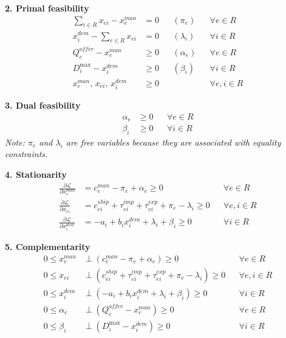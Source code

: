 \documentclass[11pt,a4paper]{article}
\begin{document}
\textbf{2. Primal feasibility}
\begin{align}
\sum_{i\in R}x_{ei}-x_e^{man} &= 0
&& (\pi_e)
&& \forall e\in R
\label{eq:kkt_primal_prod_bal}
\\
x_i^{dem}-\sum_{e\in R}x_{ei} &= 0
&& (\lambda_i)
&& \forall i\in R
\label{eq:kkt_primal_dem_bal}
\\
Q_e^{offer}-x_e^{man} &\ge 0
&& (\alpha_e)
&& \forall e\in R
\label{eq:kkt_primal_prod_bound}
\\
D_i^{\max}-x_i^{dem} &\ge 0
&& (\beta_i)
&& \forall i\in R
\label{eq:kkt_primal_dem_bound}
\\
x_e^{man},\,x_{ei},\,x_i^{dem} &\ge 0
&&
&& \forall e,i\in R
\label{eq:kkt_primal_nonneg}
\end{align}

\textbf{3. Dual feasibility}
\begin{align}
\alpha_e &\ge 0
&& \forall e\in R
\label{eq:kkt_dual_prod}
\\
\beta_i &\ge 0
&& \forall i\in R
\label{eq:kkt_dual_dem}
\end{align}
\textit{Note: \(\pi_e\) and \(\lambda_i\) are free variables because they are associated with equality constraints.}

\textbf{4. Stationarity}
\begin{align}
\frac{\partial \mathcal{L}}{\partial x_e^{man}}
&=
c_e^{man}-\pi_e+\alpha_e \ge 0
&& \forall e\in R
\label{eq:kkt_stat_prod}
\\
\frac{\partial \mathcal{L}}{\partial x_{ei}}
&=
c_{ei}^{ship}+\tau_{ei}^{imp}+\tau_{ei}^{exp}+\pi_e-\lambda_i \ge 0
&& \forall e,i\in R
\label{eq:kkt_stat_trade}
\\
\frac{\partial \mathcal{L}}{\partial x_i^{dem}}
&=
-a_i+b_i x_i^{dem}+\lambda_i+\beta_i \ge 0
&& \forall i\in R
\label{eq:kkt_stat_dem}
\end{align}

\textbf{5. Complementarity}
\begin{align}
0 \le x_e^{man}
&\perp
\left(c_e^{man}-\pi_e+\alpha_e\right)\ge 0
&& \forall e\in R
\label{eq:kkt_comp_stat_prod}
\\
0 \le x_{ei}
&\perp
\left(c_{ei}^{ship}+\tau_{ei}^{imp}+\tau_{ei}^{exp}+\pi_e-\lambda_i\right)\ge 0
&& \forall e,i\in R
\label{eq:kkt_comp_stat_trade}
\\
0 \le x_i^{dem}
&\perp
\left(-a_i+b_i x_i^{dem}+\lambda_i+\beta_i\right)\ge 0
&& \forall i\in R
\label{eq:kkt_comp_stat_dem}
\\
0 \le \alpha_e
&\perp
\left(Q_e^{offer}-x_e^{man}\right)\ge 0
&& \forall e\in R
\label{eq:kkt_comp_bound_prod}
\\
0 \le \beta_i
&\perp
\left(D_i^{\max}-x_i^{dem}\right)\ge 0
&& \forall i\in R
\label{eq:kkt_comp_bound_dem}
\end{align}
\end{document}
